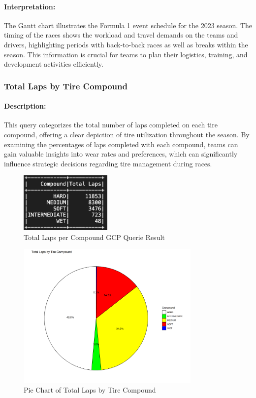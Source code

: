 \documentclass{article}
\begin{document}
\paragraph{Interpretation:}
The Gantt chart illustrates the Formula 1 event schedule for the 2023 season. The timing of the races shows the workload and travel demands on the teams and drivers, highlighting periods with back-to-back races as well as breaks within the season. This information is crucial for teams to plan their logistics, training, and development activities efficiently.


\subsubsection{Total Laps by Tire Compound}
\paragraph{Description:}
This query categorizes the total number of laps completed on each tire compound, offering a clear depiction of tire utilization throughout the season. By examining the percentages of laps completed with each compound, teams can gain valuable insights into wear rates and preferences, which can significantly influence strategic decisions regarding tire management during races.

\begin{figure}[H]
    \centering
    \includegraphics[width=0.4\textwidth]{ss-compound-laps.png}
    \caption{Total Laps per Compound GCP Querie Result}
\end{figure}

\begin{figure}[H]
    \centering
    \includegraphics[width=0.8\textwidth]{total_laps_by_compound_pie_chart.png}
    \caption{Pie Chart of Total Laps by Tire Compound}
\end{figure}
\end{document}
